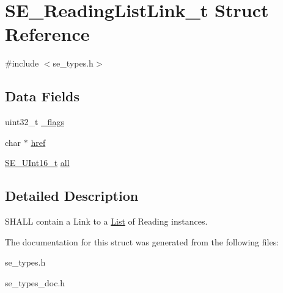 \hypertarget{structSE__ReadingListLink__t}{}\section{S\+E\+\_\+\+Reading\+List\+Link\+\_\+t Struct Reference}
\label{structSE__ReadingListLink__t}


{\ttfamily \#include $<$se\+\_\+types.\+h$>$}

\subsection*{Data Fields}
\begin{DoxyCompactItemize}
\item 
uint32\+\_\+t \hyperlink{group__ReadingListLink_ga3bcdb8ba57667805de6274f90241d39d}{\+\_\+flags}
\item 
char $\ast$ \hyperlink{group__ReadingListLink_gaa80ddfa1789e318808c6e6ec18dea4b3}{href}
\item 
\hyperlink{group__UInt16_gac68d541f189538bfd30cfaa712d20d29}{S\+E\+\_\+\+U\+Int16\+\_\+t} \hyperlink{group__ReadingListLink_ga7ae6dcda4fc482302e9eef04cc34b2de}{all}
\end{DoxyCompactItemize}


\subsection{Detailed Description}
S\+H\+A\+LL contain a Link to a \hyperlink{structList}{List} of Reading instances. 

The documentation for this struct was generated from the following files\+:\begin{DoxyCompactItemize}
\item 
se\+\_\+types.\+h\item 
se\+\_\+types\+\_\+doc.\+h\end{DoxyCompactItemize}
